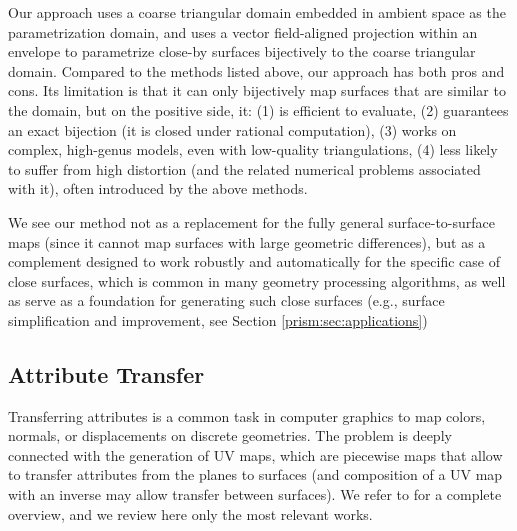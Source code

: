 %
Our approach uses a coarse triangular domain embedded in ambient space as the parametrization domain, and uses a vector field-aligned projection within an envelope to parametrize close-by surfaces bijectively to the coarse triangular domain. Compared to the methods listed above, our approach has both pros and cons. Its limitation is that it can only bijectively map surfaces that are similar to the domain, but on the positive side, it: (1) is efficient to evaluate, (2)  guarantees an exact bijection (it is closed under rational computation), (3)  works on complex, high-genus models, even with low-quality triangulations, (4) less likely to suffer from high distortion (and the related numerical problems associated with it), often introduced by the above methods.

 We see our method not as a replacement for the fully general surface-to-surface maps (since it cannot map surfaces with large geometric differences), but as a complement designed to work robustly and automatically for the specific case of close surfaces, which is common in many geometry processing algorithms, as well as serve as a foundation for generating such close surfaces (e.g., surface simplification and improvement, see Section \ref{prism:sec:applications})


\subsection{Attribute Transfer}
\label{prism:sec:rel:transfer}

Transferring attributes is a common task in computer graphics to map colors, normals, or displacements on discrete geometries. 
The problem is deeply connected with the generation of UV maps, which are piecewise maps that allow to transfer attributes from the planes to surfaces (and composition of a UV map with an inverse may allow transfer between surfaces).  We refer to \cite{FloaterSurvey:2005,Sheffer:2006,Hormann:2007} for a complete overview, and we review here only the most relevant works.

